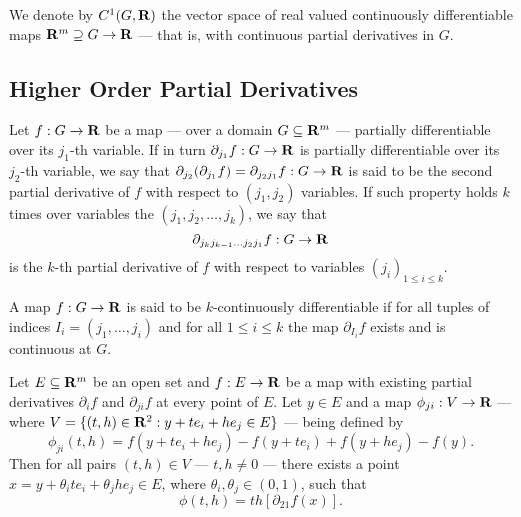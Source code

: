 \begin{definition}
  We denote by \(C^1(G, \mathbf{R})\) the vector space of real valued continuously
  differentiable maps \(\mathbf{R}^m \supseteq G \to \mathbf{R}\) --- that is, with continuous
  partial derivatives in \(G\).
\end{definition}

\subsection{Higher Order Partial Derivatives}

\begin{definition}
  \label{def: kth-partial}
  Let \(f: G \to \mathbf{R}\) be a map --- over a domain \(G \subseteq \mathbf{R}^m\) ---
  partially differentiable over its \(j_1\)-th variable. If in turn
  \(\partial_{j_1} f: G \to \mathbf{R}\) is partially differentiable over its \(j_2\)-th
  variable, we say that \(\partial_{j_2}(\partial_{j_1} f) = \partial_{j_2 j_1}
  f: G \to \mathbf{R}\) is said to be the second partial derivative of \(f\) with
  respect to \((j_1, j_2)\) variables. If such property holds \(k\) times over
  variables the \((j_1, j_2, \dots, j_k)\), we say that
  \[
    \partial_{j_k j_{k-1} \dots j_2 j_1} f: G \to \mathbf{R}
  \]
  is the \(k\)-th partial derivative of \(f\) with respect to variables
  \((j_i)_{1 \leq i \leq k}\).
\end{definition}

\begin{definition}
  A map \(f: G \to \mathbf{R}\) is said to be \(k\)-continuously differentiable if for
  all tuples of indices \(I_i = (j_1, \dots, j_i)\) and for all \(1 \leq i \leq
  k\) the map \(\partial_{I_i} f\) exists and is continuous at \(G\).
\end{definition}

\begin{lemma}\label{lem: order-var-partial}
  Let \(E \subseteq \mathbf{R}^m\) be an open set and \(f: E \to \mathbf{R}\) be a map with
  existing partial derivatives \(\partial_i f\) and \(\partial_{ji} f\) at every
  point of \(E\). Let \(y \in E\) and a map \(\phi_{ji}: V \to \mathbf{R}\) --- where
  \(V = \{(t, h) \in \mathbf{R}^2 : y + t e_i + h e_j \in E\} \) --- being defined by
  \[
    \phi_{ji}(t, h) = f(y + t e_i + h e_j) - f(y + t e_i) + f(y + h e_j) - f(y).
  \]
  Then for all pairs \((t, h) \in V\) --- \(t, h \neq 0\) --- there exists a
  point \(x = y + \theta_i t e_i + \theta_j h e_j \in E\), where \(\theta_i,
  \theta_j \in (0, 1)\), such that
  \[
    \phi(t, h) = t h [\partial_{2 1} f(x)].
  \]
\end{lemma}

